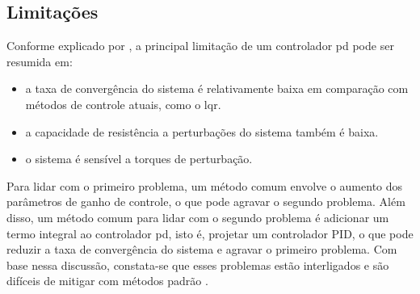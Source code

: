 \subsection{Limitações}

Conforme explicado por \cite{qi2022variable}, a principal limitação de um controlador \gls{pd} pode ser resumida em:
 
\begin{itemize}
  \item a taxa de convergência do sistema é relativamente baixa em comparação com métodos de controle atuais, como o \gls{lqr}.
  \item a capacidade de resistência a perturbações do sistema também é baixa.
  \item o sistema é sensível a torques de perturbação.
\end{itemize}

Para lidar com o primeiro problema, um método comum envolve o aumento dos parâmetros de ganho de controle, o que pode agravar o segundo problema.
Além disso, um método comum para lidar com o segundo problema é adicionar um termo integral ao controlador \gls{pd}, isto é, projetar um controlador PID, o que pode reduzir a taxa de convergência do sistema e agravar o primeiro problema.
Com base nessa discussão, constata-se que esses problemas estão interligados e são difíceis de mitigar com métodos padrão \cite{qi2022variable}.
